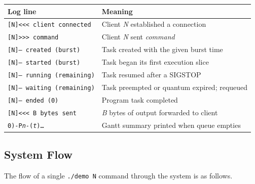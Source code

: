 \documentclass[12pt]{article}
\begin{document}
\begin{center}
\begin{tabular}{ll}
\toprule
\textbf{Log line} & \textbf{Meaning} \\
\midrule
\texttt{[N]<<< client connected}    & Client \textit{N} established a connection \\
\texttt{[N]>>> command}             & Client \textit{N} sent \textit{command} \\
\texttt{[N]--- created (burst)}     & Task created with the given burst time \\
\texttt{[N]--- started (burst)}     & Task began its first execution slice \\
\texttt{[N]--- running (remaining)} & Task resumed after a SIGSTOP \\
\texttt{[N]--- waiting (remaining)} & Task preempted or quantum expired; requeued \\
\texttt{[N]--- ended (0)}           & Program task completed \\
\texttt{[N]<<< B bytes sent}        & \textit{B} bytes of output forwarded to client \\
\texttt{0)-P\textit{n}-(\textit{t})\ldots} & Gantt summary printed when queue empties \\
\bottomrule
\end{tabular}
\end{center}

\subsection{System Flow}

The flow of a single \texttt{./demo N} command through the system is as follows.
\end{document}
